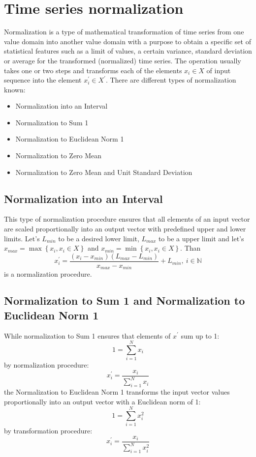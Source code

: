 \section{Time series normalization}

Normalization is a type of mathematical transformation of time series from one value domain into another value domain with a purpose to obtain a specific set of statistical features such as a limit of values, a certain variance, standard deviation or average for the transformed (normalized) time series. The operation usually takes one or two steps and transforms each of the elements $x_{i} \in X$ of input sequence into the element $x_{i}^{'} \in X^{'}$. There are different types of normalization known:
\begin{itemize}
	\item Normalization into an Interval \cite{citeulike:4295248} \cite{citeulike:2753031}
  \item Normalization to Sum 1
  \item Normalization to Euclidean Norm 1
  \item Normalization to Zero Mean
  \item Normalization to Zero Mean and Unit Standard Deviation \cite{citeulike:3815880}
\end{itemize}

\subsection{Normalization into an Interval}
This type of normalization procedure ensures that all elements of an input vector are scaled proportionally into an output vector with predefined upper and lower limits.
Let's $L_{min}$ to be a desired lower limit, $L_{max}$ to be a upper limit and let's $x_{max} = \max \left\{ x_{i}, x_{i} \in X \right\}$ and $x_{min} = \min \left\{ x_{i}, x_{i} \in X \right\}$. Than
\[
x_{i}^{'} = \frac{ (x_{i}-x_{min}) (L_{max} - L_{min}) }{ x_{max} - x_{min} } + L_{min	}, \: i \in \mathbb{N}
\]
is a normalization procedure.

\subsection{Normalization to Sum 1 and Normalization to Euclidean Norm 1}
While normalization to Sum 1 ensures that elements of $x^{'}$ sum up to 1:
\[
1 = \sum_{i=1}^{N} x_{i}
\]
by normalization procedure:
\[
x_{i}^{'} = \frac{ x_{i} }{ \sum_{i=1}^{N} x_{i} }
\]
the Normalization to Euclidean Norm 1 transforms the input vector values proportionally into an output vector with a Euclidean norm of 1:
\[
1 = \sum_{i=1}^{N} x_{i}^{2}
\]
by transformation procedure:
\[
x_{i}^{'} = \frac{ x_{i} }{ \sum_{i=1}^{N} x_{i}^2 }
\]

